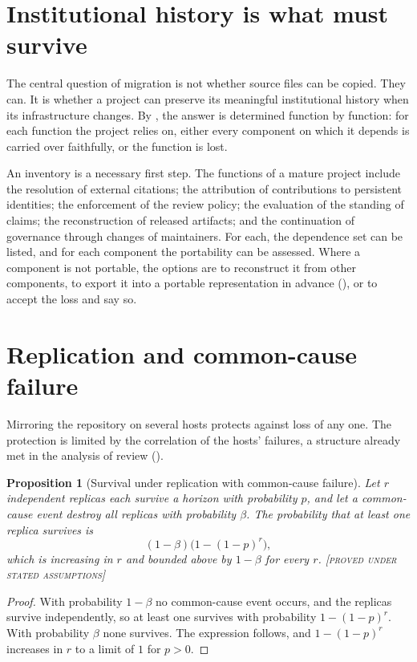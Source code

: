 \documentclass[11pt,twoside,openright]{book}
\theoremstyle{plain}
\newtheorem{proposition}[theorem]{Proposition}
\theoremstyle{definition}
\theoremstyle{remark}
\newcommand{\Proved}{\textup{\textsc{[proved under stated assumptions]}}}
\begin{document}
\section{Institutional history is what must survive}

The central question of migration is not whether source files can be copied. They can. It is whether a project can preserve its meaningful institutional history when its infrastructure changes. By , the answer is determined function by function: for each function the project relies on, either every component on which it depends is carried over faithfully, or the function is lost.

An inventory is a necessary first step. The functions of a mature project include the resolution of external citations; the attribution of contributions to persistent identities; the enforcement of the review policy; the evaluation of the standing of claims; the reconstruction of released artifacts; and the continuation of governance through changes of maintainers. For each, the dependence set can be listed, and for each component the portability can be assessed. Where a component is not portable, the options are to reconstruct it from other components, to export it into a portable representation in advance (), or to accept the loss and say so.

\section{Replication and common-cause failure}

Mirroring the repository on several hosts protects against loss of any one. The protection is limited by the correlation of the hosts' failures, a structure already met in the analysis of review ().

\begin{proposition}[Survival under replication with common-cause failure]\label{prop:replication}
Let $r$ independent replicas each survive a horizon with probability $p$, and let a common-cause event destroy all replicas with probability $\beta$. The probability that at least one replica survives is
\[
(1-\beta)\bigl(1-(1-p)^r\bigr),
\]
which is increasing in $r$ and bounded above by $1-\beta$ for every $r$.
\Proved{}
\end{proposition}

\begin{proof}
With probability $1-\beta$ no common-cause event occurs, and the replicas survive independently, so at least one survives with probability $1-(1-p)^r$. With probability $\beta$ none survives. The expression follows, and $1-(1-p)^r$ increases in $r$ to a limit of $1$ for $p>0$.
\end{proof}
\end{document}
